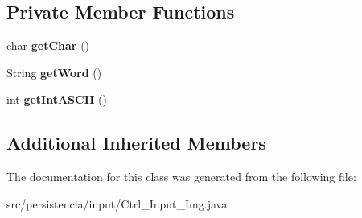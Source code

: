 \subsection*{Private Member Functions}
\begin{DoxyCompactItemize}
\item 
\mbox{\label{classpersistencia_1_1input_1_1Ctrl__Input__Img_a6a4bdb0d78c8e25e0782a71875b5e541}} 
char {\bfseries get\+Char} ()
\item 
\mbox{\label{classpersistencia_1_1input_1_1Ctrl__Input__Img_a4219a110d7d84e7b883ffd88e18a0def}} 
String {\bfseries get\+Word} ()
\item 
\mbox{\label{classpersistencia_1_1input_1_1Ctrl__Input__Img_a430158ff229038ddc3476d406239f4cd}} 
int {\bfseries get\+Int\+A\+S\+C\+II} ()
\end{DoxyCompactItemize}
\subsection*{Additional Inherited Members}


The documentation for this class was generated from the following file\+:\begin{DoxyCompactItemize}
\item 
src/persistencia/input/Ctrl\+\_\+\+Input\+\_\+\+Img.\+java\end{DoxyCompactItemize}
